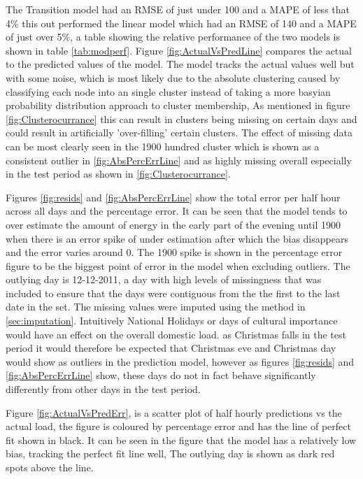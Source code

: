 The Transition model had an RMSE of just under 100 and a MAPE of less that 4\% this out performed the linear model which had an RMSE of 140 and a MAPE of just over 5\%, a table showing the relative performance of the two models is shown in table \ref{tab:modperf}. Figure \ref{fig:ActualVsPredLine} compares the actual to the predicted values of the model. The model tracks the actual values well but with some noise, which is most likely due to the absolute clustering caused by classifying each node into an single cluster instead of taking a more basyian probability distribution approach to cluster membership, As mentioned in figure \ref{fig:Clusterocurrance} this can result in clusters being missing on certain days and could result in artificially 'over-filling' certain clusters. The effect of missing data can be most clearly seen in the 1900 hundred cluster which is shown as a consistent outlier in \ref{fig:AbsPercErrLine} and as highly missing overall especially in the test period as shown in \ref{fig:Clusterocurrance}. 

Figures \ref{fig:resids} and \ref{fig:AbsPercErrLine} show the total error per half hour across all days and the percentage error. It can be seen that the model tends to over estimate the amount of energy in the early part of the evening until 1900 when there is an error spike of under estimation after which the bias disappears and the error varies around 0. The 1900 spike is shown in the percentage error figure to be the biggest point of error in the model when excluding outliers. The outlying day is 12-12-2011, a day with high levels of missingness that was included to ensure that the days were contiguous from the the first to the last date in the set. The missing values were imputed using the method in \ref{sec:imputation}. 
Intuitively National Holidays or days of cultural importance would have an effect on the overall domestic load. as Christmas falls in the test period it would therefore be expected that Christmas eve and Christmas day would show as outliers in the prediction model, however as figures \ref{fig:resids} and \ref{fig:AbsPercErrLine} show, these days do not in fact behave significantly differently from other days in the test period.

Figure \ref{fig:ActualVsPredErr}, is a scatter plot of half hourly predictions vs the actual load, the figure is coloured by percentage error and has the line of perfect fit shown in black. It can be seen in the figure that the model has a relatively low bias, tracking the perfect fit line well, The outlying day is shown as dark red spots above the line.

